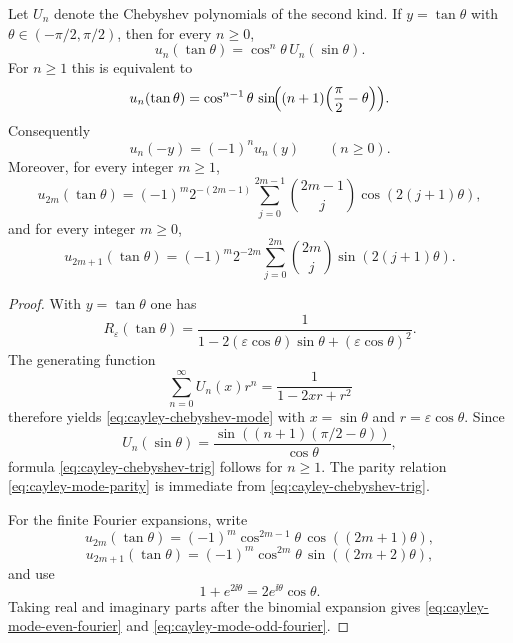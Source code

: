 \begin{theorem}%
\label{thm:cayley-chebyshev-mode}
Let $U_n$ denote the Chebyshev polynomials of the second kind.  If
$y=\tan\theta$ with $\theta\in(-\pi/2,\pi/2)$, then for every $n\ge 0$,
\begin{equation}\label{eq:cayley-chebyshev-mode}
u_n(\tan\theta)=\cos^n\theta\,U_n(\sin\theta).
\end{equation}
For $n\ge 1$ this is equivalent to
\begin{equation}\label{eq:cayley-chebyshev-trig}
u_n(\tan\theta)
=\cos^{n-1}\theta\,
\sin\!\Bigl((n+1)\Bigl(\frac{\pi}{2}-\theta\Bigr)\Bigr).
\end{equation}
Consequently
\begin{equation}\label{eq:cayley-mode-parity}
u_n(-y)=(-1)^n u_n(y)
\qquad(n\ge 0).
\end{equation}
Moreover, for every integer $m\ge 1$,
\begin{equation}\label{eq:cayley-mode-even-fourier}
u_{2m}(\tan\theta)
=(-1)^m 2^{-(2m-1)}
\sum_{j=0}^{2m-1}\binom{2m-1}{j}\cos(2(j+1)\theta),
\end{equation}
and for every integer $m\ge 0$,
\begin{equation}\label{eq:cayley-mode-odd-fourier}
u_{2m+1}(\tan\theta)
=(-1)^m 2^{-2m}
\sum_{j=0}^{2m}\binom{2m}{j}\sin(2(j+1)\theta).
\end{equation}
\end{theorem}

\begin{proof}
With $y=\tan\theta$ one has
\[
R_\varepsilon(\tan\theta)
=\frac{1}{1-2(\varepsilon\cos\theta)\sin\theta+(\varepsilon\cos\theta)^2}.
\]
The generating function
\[
\sum_{n=0}^{\infty}U_n(x)r^n=\frac{1}{1-2xr+r^2}
\]
therefore yields \eqref{eq:cayley-chebyshev-mode} with
$x=\sin\theta$ and $r=\varepsilon\cos\theta$.  Since
\[
U_n(\sin\theta)
=\frac{\sin((n+1)(\pi/2-\theta))}{\cos\theta},
\]
formula \eqref{eq:cayley-chebyshev-trig} follows for $n\ge 1$.  The
parity relation \eqref{eq:cayley-mode-parity} is immediate from
\eqref{eq:cayley-chebyshev-trig}.

For the finite Fourier expansions, write
\[
u_{2m}(\tan\theta)=(-1)^m\cos^{2m-1}\theta\,\cos((2m+1)\theta),
\]
\[
u_{2m+1}(\tan\theta)=(-1)^m\cos^{2m}\theta\,\sin((2m+2)\theta),
\]
and use
\[
1+e^{2\ii\theta}=2e^{\ii\theta}\cos\theta.
\]
Taking real and imaginary parts after the binomial expansion gives
\eqref{eq:cayley-mode-even-fourier} and
\eqref{eq:cayley-mode-odd-fourier}.
\end{proof}

